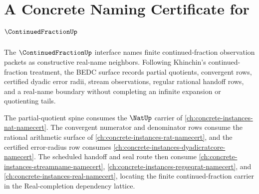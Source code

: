 \chapter{A Concrete Naming Certificate for $\ContinuedFractionUp$}
\label{ch:concrete-instances-continuedfraction-namecert}

The $\ContinuedFractionUp$ interface names finite continued-fraction
observation packets as constructive real-name neighbors. Following Khinchin's
continued-fraction treatment, the BEDC surface records partial quotients,
convergent rows, certified dyadic error radii, stream observations, regular
rational handoff rows, and a real-name boundary without completing an infinite
expansion or quotienting tails.

The partial-quotient spine consumes the $\NatUp$ carrier of
\autoref{ch:concrete-instances-nat-namecert}. The convergent numerator and
denominator rows consume the rational arithmetic surface of
\autoref{ch:concrete-instances-rat-namecert}, and the certified error-radius
row consumes \autoref{ch:concrete-instances-dyadicratcore-namecert}. The
scheduled handoff and seal route then consume
\autoref{ch:concrete-instances-streamname-namecert},
\autoref{ch:concrete-instances-regseqrat-namecert}, and
\autoref{ch:concrete-instances-real-namecert}, locating the finite
continued-fraction carrier in the Real-completion dependency lattice.

